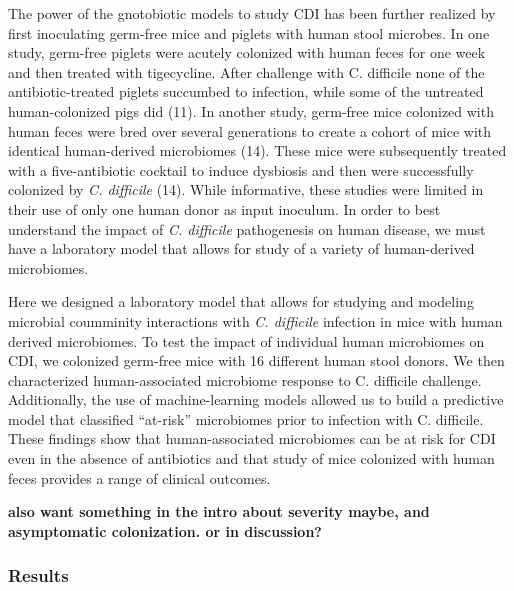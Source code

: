 \documentclass[11pt,]{article}
\begin{document}
The power of the gnotobiotic models to study CDI has been further
realized by first inoculating germ-free mice and piglets with human
stool microbes. In one study, germ-free piglets were acutely colonized
with human feces for one week and then treated with tigecycline. After
challenge with C. difficile none of the antibiotic-treated piglets
succumbed to infection, while some of the untreated human-colonized pigs
did (11). In another study, germ-free mice colonized with human feces
were bred over several generations to create a cohort of mice with
identical human-derived microbiomes (14). These mice were subsequently
treated with a five-antibiotic cocktail to induce dysbiosis and then
were successfully colonized by \emph{C. difficile} (14). While
informative, these studies were limited in their use of only one human
donor as input inoculum. In order to best understand the impact of
\emph{C. difficile} pathogenesis on human disease, we must have a
laboratory model that allows for study of a variety of human-derived
microbiomes.

Here we designed a laboratory model that allows for studying and
modeling microbial coumminity interactions with \emph{C. difficile}
infection in mice with human derived microbiomes. To test the impact of
individual human microbiomes on CDI, we colonized germ-free mice with 16
different human stool donors. We then characterized human-associated
microbiome response to C. difficile challenge. Additionally, the use of
machine-learning models allowed us to build a predictive model that
classified ``at-risk'' microbiomes prior to infection with C. difficile.
These findings show that human-associated microbiomes can be at risk for
CDI even in the absence of antibiotics and that study of mice colonized
with human feces provides a range of clinical outcomes.

\textbf{also want something in the intro about severity maybe, and
asymptomatic colonization. or in discussion?}

\subsubsection{Results}\label{results}
\end{document}
